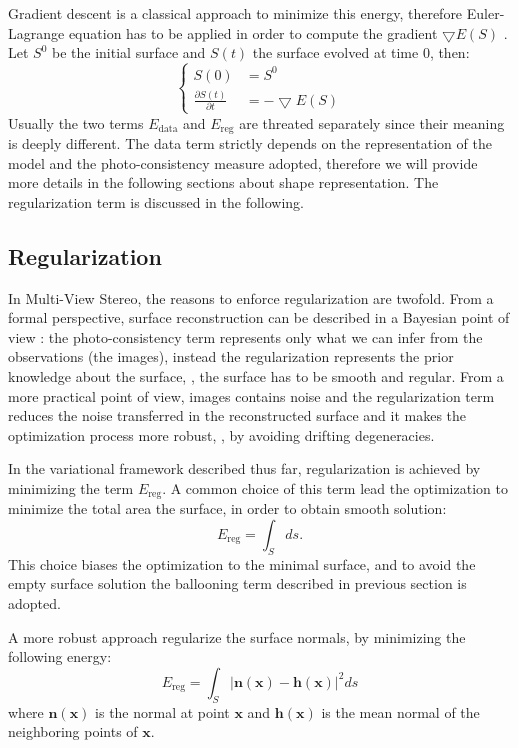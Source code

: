 Gradient descent is a classical approach to minimize this energy, therefore Euler-Lagrange equation has to be applied in order to compute the gradient $\bigtriangledown E(\mathit{S})$ \cite{hermosillo2002variational}. Let $\mathit{S}^0$ be the initial surface and $\mathit{S}(t)$ the surface evolved at time $0$, then:
\begin{equation}
 \begin{cases}
  \mathit{S}(0) &=\mathit{S}^0\\
  \frac{\partial \mathit{S}(t)}{\partial t} & = -\bigtriangledown E(\mathit{S})
 \end{cases}
\end{equation}
Usually the two terms $E_{\text{data}}$ and $E_{\text{reg}}$ are threated separately since their meaning is deeply different.
The data term strictly depends on the representation of the model and the photo-consistency measure adopted, therefore we will provide more details in the following sections about shape representation. 
The regularization term is discussed in the following.
\subsection{Regularization}
In Multi-View Stereo, the reasons to enforce regularization are twofold. From a formal perspective, surface reconstruction can be described in a Bayesian point of view \cite[p. 11]{delaunoy2011modelisation}: the photo-consistency term represents only what we can infer from the observations (the images), instead the regularization represents the prior knowledge about the surface, \ie, the surface has to be smooth and regular. 
From a more practical point of view, images contains noise and the regularization term reduces the noise transferred in the reconstructed surface and it makes the optimization process more robust, \eg, by avoiding drifting degeneracies.

In the variational framework described thus far, regularization is achieved by minimizing the term $E_{\text{reg}}$. 
A common choice of this term lead the optimization to minimize the total area the surface, in order to obtain smooth solution:
\[
E_{\text{reg}} = \int_{\mathit{S}} ds.
\]
This choice biases the optimization to the minimal surface, and to avoid the empty surface solution the ballooning term described in previous section is adopted.

A more robust approach regularize the surface normals, by minimizing the following energy:
\[
E_{\text{reg}} = \int_{\mathit{S}} |\mathbf{n}(\mathbf{x}) - \mathbf{h}(\mathbf{x})|^2 ds
\]
where $\mathbf{n}(\mathbf{x})$ is the normal at point $\mathbf{x}$ and $\mathbf{h}(\mathbf{x})$ is the mean normal of the neighboring points of $\mathbf{x}$.

